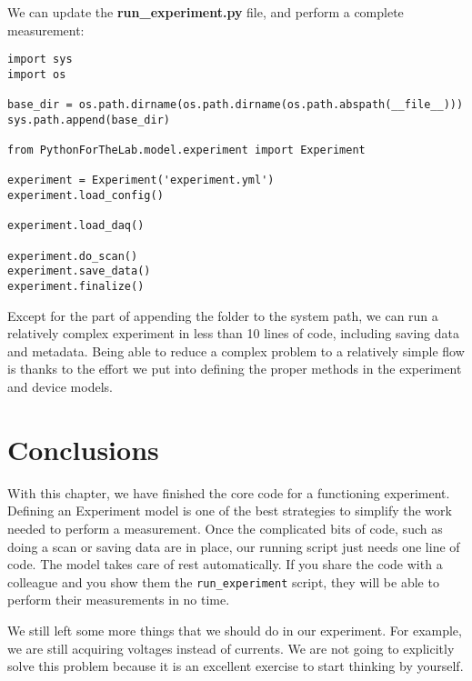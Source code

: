 We can update the \textbf{run\_experiment.py} file, and perform a complete measurement:

\begin{verbatim}
import sys
import os

base_dir = os.path.dirname(os.path.dirname(os.path.abspath(__file__)))
sys.path.append(base_dir)

from PythonForTheLab.model.experiment import Experiment

experiment = Experiment('experiment.yml')
experiment.load_config()

experiment.load_daq()

experiment.do_scan()
experiment.save_data()
experiment.finalize()
\end{verbatim}

Except for the part of appending the folder to the system path, we can run a relatively complex experiment in less than 10 lines of code, including saving data and metadata. Being able to reduce a complex problem to a relatively simple flow is thanks to the effort we put into defining the proper methods in the experiment and device models.

\section{Conclusions}\label{section:experiment-model-conclusions}
With this chapter, we have finished the core code for a functioning experiment. Defining an Experiment model is one of the best strategies to simplify the work needed to perform a measurement. Once the complicated bits of code, such as doing a scan or saving data are in place, our running script just needs one line of code. The model takes care of rest automatically. If you share the code with a colleague and you show them the \texttt{run\_experiment} script, they will be able to perform their measurements in no time.

We still left some more things that we should do in our experiment. For example, we are still acquiring voltages instead of currents. We are not going to explicitly solve this problem because it is an excellent exercise to start thinking by yourself.



